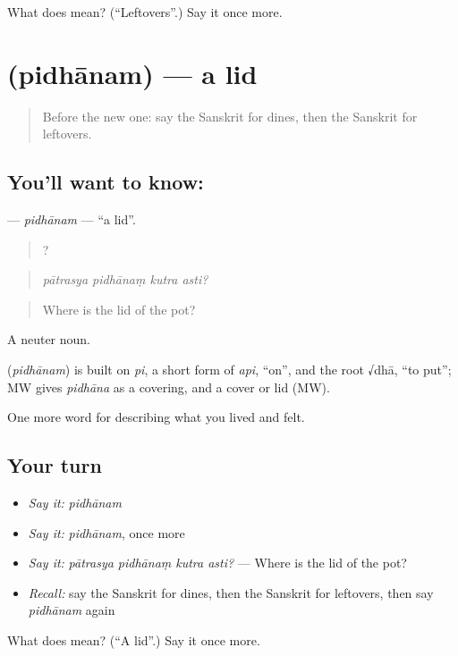 \begin{tcolorbox}[breakable,colback=teal!4,colframe=teal!35!black,title={Before you move on}]
What does  mean? (\textquotedblleft{}Leftovers\textquotedblright{}.) Say it once more.
\end{tcolorbox}
\section[\texorpdfstring{\sk{पिधानम्} (pidhānam)}{पिधानम् (pidhānam)}]{ (pidhānam) — a lid}

\label{lesson:SA-C514-pidhanam}



\begin{quote}
Before the new one: say the Sanskrit for dines, then the Sanskrit for leftovers.
\end{quote}

\subsection*{You'll want to know: }
\textbf{} — \emph{pidhānam} — \textquotedblleft{}a lid\textquotedblright{}.

\begin{quote}
   ?
\end{quote}

\begin{quote}
\emph{pātrasya pidhānaṃ kutra asti?}
\end{quote}

\begin{quote}
Where is the lid of the pot?
\end{quote}

A neuter noun.

\begin{cousinweb}
\textbf{} (\emph{pidhānam}) is built on \emph{pi}, a short form of \emph{api}, \textquotedblleft{}on\textquotedblright{}, and the root √dhā, \textquotedblleft{}to put\textquotedblright{}; MW gives \emph{pidhāna} as a covering, and a cover or lid (MW).
\end{cousinweb}

\begin{grammarlens}[title={What you've built}]
One more word for describing what you lived and felt.
\end{grammarlens}

\subsection*{Your turn}
\begin{itemize}
\raggedright
  \item \emph{Say it:} \emph{pidhānam}
  \item \emph{Say it:} \emph{pidhānam}, once more
  \item \emph{Say it:} \emph{pātrasya pidhānaṃ kutra asti?} — Where is the lid of the pot?
  \item \emph{Recall:} say the Sanskrit for dines, then the Sanskrit for leftovers, then say \emph{pidhānam} again
\end{itemize}

\begin{tcolorbox}[breakable,colback=teal!4,colframe=teal!35!black,title={Before you move on}]
What does  mean? (\textquotedblleft{}A lid\textquotedblright{}.) Say it once more.
\end{tcolorbox}
